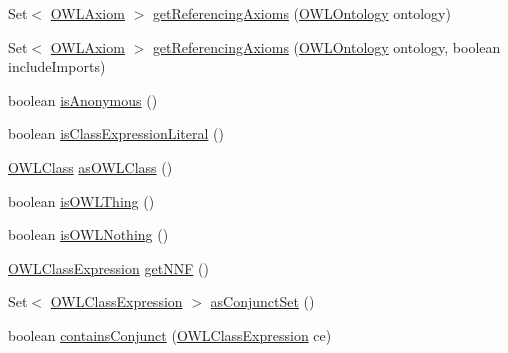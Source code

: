 \begin{DoxyCompactItemize}
\item 
Set$<$ \hyperlink{interfaceorg_1_1semanticweb_1_1owlapi_1_1model_1_1_o_w_l_axiom}{O\-W\-L\-Axiom} $>$ \hyperlink{classuk_1_1ac_1_1manchester_1_1cs_1_1owl_1_1owlapi_1_1_o_w_l_class_impl_ac3722c1133d27e3e9916caaa9d71ed5e}{get\-Referencing\-Axioms} (\hyperlink{interfaceorg_1_1semanticweb_1_1owlapi_1_1model_1_1_o_w_l_ontology}{O\-W\-L\-Ontology} ontology)
\item 
Set$<$ \hyperlink{interfaceorg_1_1semanticweb_1_1owlapi_1_1model_1_1_o_w_l_axiom}{O\-W\-L\-Axiom} $>$ \hyperlink{classuk_1_1ac_1_1manchester_1_1cs_1_1owl_1_1owlapi_1_1_o_w_l_class_impl_ac7d4653f3f3e577dac3126d41cd0e08b}{get\-Referencing\-Axioms} (\hyperlink{interfaceorg_1_1semanticweb_1_1owlapi_1_1model_1_1_o_w_l_ontology}{O\-W\-L\-Ontology} ontology, boolean include\-Imports)
\item 
boolean \hyperlink{classuk_1_1ac_1_1manchester_1_1cs_1_1owl_1_1owlapi_1_1_o_w_l_class_impl_a36096c20ddf7ca229b60d7e107fd3e8b}{is\-Anonymous} ()
\item 
boolean \hyperlink{classuk_1_1ac_1_1manchester_1_1cs_1_1owl_1_1owlapi_1_1_o_w_l_class_impl_afc112b57ec7c1d18049428824a775be9}{is\-Class\-Expression\-Literal} ()
\item 
\hyperlink{interfaceorg_1_1semanticweb_1_1owlapi_1_1model_1_1_o_w_l_class}{O\-W\-L\-Class} \hyperlink{classuk_1_1ac_1_1manchester_1_1cs_1_1owl_1_1owlapi_1_1_o_w_l_class_impl_ad3d5d6f8a572738de754fd3c0675ab3b}{as\-O\-W\-L\-Class} ()
\item 
boolean \hyperlink{classuk_1_1ac_1_1manchester_1_1cs_1_1owl_1_1owlapi_1_1_o_w_l_class_impl_aa0f9cf9a8dc70e855fd43afc5e59ea2c}{is\-O\-W\-L\-Thing} ()
\item 
boolean \hyperlink{classuk_1_1ac_1_1manchester_1_1cs_1_1owl_1_1owlapi_1_1_o_w_l_class_impl_abcc507ac215e051a339ea76402704e51}{is\-O\-W\-L\-Nothing} ()
\item 
\hyperlink{interfaceorg_1_1semanticweb_1_1owlapi_1_1model_1_1_o_w_l_class_expression}{O\-W\-L\-Class\-Expression} \hyperlink{classuk_1_1ac_1_1manchester_1_1cs_1_1owl_1_1owlapi_1_1_o_w_l_class_impl_af45bd066969590a729c18afbdf1c681b}{get\-N\-N\-F} ()
\item 
Set$<$ \hyperlink{interfaceorg_1_1semanticweb_1_1owlapi_1_1model_1_1_o_w_l_class_expression}{O\-W\-L\-Class\-Expression} $>$ \hyperlink{classuk_1_1ac_1_1manchester_1_1cs_1_1owl_1_1owlapi_1_1_o_w_l_class_impl_ad09d8b4b1e07897c2298b43a2d35599f}{as\-Conjunct\-Set} ()
\item 
boolean \hyperlink{classuk_1_1ac_1_1manchester_1_1cs_1_1owl_1_1owlapi_1_1_o_w_l_class_impl_a0bfdb3abfcb7b95dbb0ad3d3b6d33f05}{contains\-Conjunct} (\hyperlink{interfaceorg_1_1semanticweb_1_1owlapi_1_1model_1_1_o_w_l_class_expression}{O\-W\-L\-Class\-Expression} ce)

\end{DoxyCompactItemize}
